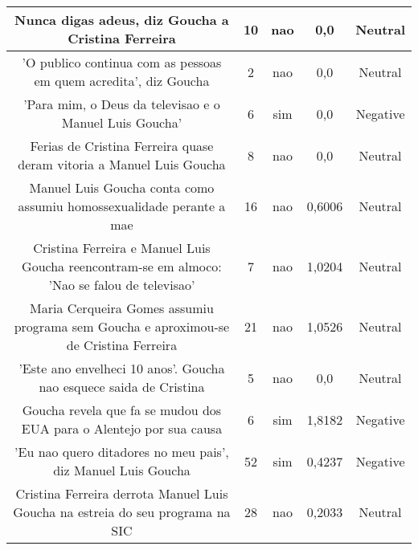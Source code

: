 \documentclass[11pt]{article}
\newlength\mylength
\begin{document}
\begin{center}
\begin{longtable}{||C{.40\mylength}||C{.20\mylength}||C{.20\mylength}||C{.30\mylength}||C{.20\mylength}||}
   Nunca digas adeus, diz Goucha a Cristina Ferreira  & 10 & nao & 0,0 & Neutral \\  \hline
   'O publico continua com as pessoas em quem acredita', diz Goucha  & 2 & nao & 0,0 & Neutral \\  \hline
   'Para mim, o Deus da televisao e o Manuel Luis Goucha'  & 6 & sim & 0,0 & Negative \\  \hline
   Ferias de Cristina Ferreira quase deram vitoria a Manuel Luis Goucha  & 8 & nao & 0,0 & Neutral \\  \hline
   Manuel Luis Goucha conta como assumiu homossexualidade perante a mae  & 16 & nao & 0,6006 & Neutral \\  \hline
   Cristina Ferreira e Manuel Luis Goucha reencontram-se em almoco: 'Nao se falou de televisao' & 7 & nao & 1,0204 & Neutral \\  \hline
   Maria Cerqueira Gomes assumiu programa sem Goucha e aproximou-se de Cristina Ferreira  & 21 & nao & 1,0526 & Neutral \\  \hline
   'Este ano envelheci 10 anos'. Goucha nao esquece saida de Cristina  & 5 & nao & 0,0 & Neutral \\  \hline
   Goucha revela que fa se mudou dos EUA para o Alentejo por sua causa  & 6 & sim & 1,8182 & Negative \\  \hline
   'Eu nao quero ditadores no meu pais', diz Manuel Luis Goucha  & 52 & sim & 0,4237 & Negative \\  \hline
   Cristina Ferreira derrota Manuel Luis Goucha na estreia do seu programa na SIC  & 28 & nao & 0,2033 & Neutral \\  \hline

\end{longtable}
\end{center}
\end{document}
